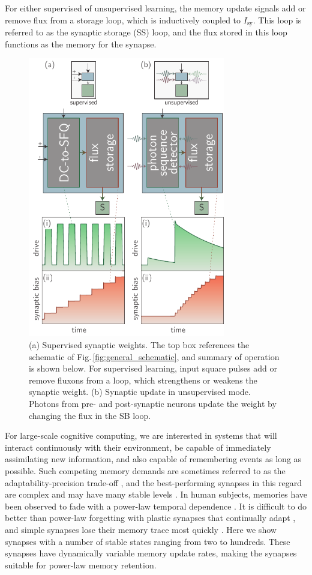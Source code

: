 \documentclass[twocolumn]{article}
\begin{document}
For either supervised of unsupervised learning, the memory update signals add or remove flux from a storage loop, which is inductively coupled to $I_{\mathrm{sy}}$. This loop is referred to as the synaptic storage (SS) loop, and the flux stored in this loop functions as the memory for the synapse.
\begin{figure}[t!]
	\centerline{\includegraphics[width=8.6cm]{_synapticPlasticity_schematic_small.pdf}}
	\caption{\label{fig:synapticPlasticity_schematic}(a) Supervised synaptic weights. The top box references the schematic of Fig.\,\ref{fig:general_schematic}, and summary of operation is shown below. For supervised learning, input square pulses add or remove fluxons from a loop, which strengthens or weakens the synaptic weight. (b) Synaptic update in unsupervised mode. Photons from pre- and post-synaptic neurons update the weight by changing the flux in the SB loop.}
\end{figure}

For large-scale cognitive computing, we are interested in systems that will interact continuously with their environment, be capable of immediately assimilating new information, and also capable of remembering events as long as possible. Such competing memory demands are sometimes referred to as the adaptability-precision trade-off \cite{khso2017}, and the best-performing synapses in this regard are complex \cite{fudr2005} and may have many stable levels \cite{fuab2007}. In human subjects, memories have been observed to fade with a power-law temporal dependence \cite{wieb1991,wieb1997}. It is difficult to do better than power-law forgetting with plastic synapses that continually adapt \cite{fudr2005}, and simple synapses lose their memory trace most quickly \cite{fuab2007}. Here we show synapses with a number of stable states ranging from two to hundreds. These synapses have dynamically variable memory update rates, making the synapses suitable for power-law memory retention.
\end{document}
